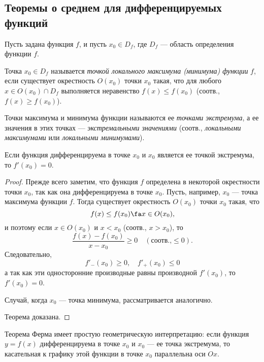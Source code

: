 \subsection{Теоремы о среднем для дифференцируемых функций}
Пусть задана функция $f$, и пусть $x_0 \in D_f$, где $D_f$ — область определения функции $f$.
\begin{defn}
Точка $x_0 \in D_f$ называется \textit{точкой локального максимума (минимума) функции} $f$, если существует окрестность $O(x_0)$ точки $x_0$ такая, что для любого $x \in O(x_0)\cap D_f$ выполняется неравенство $f(x) \le f(x_0)$ (соотв., $f(x) \ge f(x_0)$).
\end{defn}
\begin{defn} Точки максимума и минимума функции называются ее \textit{точками экстремума}, а ее значения в этих точках — \textit{экстремальными значениями} (соотв., \textit{локальными максимумами} или \textit{локальными минимумами}).
\end{defn}
\begin{thm}[Ферма]\label{ch4n1} 
Если функция дифференцируема в точке $x_0$ и $x_0$ является ее точкой экстремума, то $f'(x_0) = 0$.
\end{thm}
\begin{proof}
Прежде всего заметим, что функция $f$ определена в некоторой окрестности точки $x_0$, так как она дифференцируема в точке $x_0$. Пусть, например, $x_0$ — точка максимума функции $f$. Тогда существует окрестность $O(x_0)$ точки $x_0$ такая, что 
$$
f(x) \le f(x_0) \fa x \in O(x_0),
$$
и поэтому если $x \in O(x_0)$ и $x < x_0$ (соотв., $x > x_0$), то
$$
\frac{f(x)-f(x_0)}{x-x_0}\ge0\quad (\text{соотв.,} \le 0).
$$
Следовательно,
$$
f'_{-}(x_0)\ge 0, \quad f'_{+}(x_0)\le 0
$$
а так как эти односторонние производные равны производной $f'(x_0)$,
то $f'(x_0) = 0$. 

Случай, когда $x_0$ --- точка минимума, рассматривается аналогично. 

\noindent 
Теорема доказана.
\end{proof}

Теорема Ферма имеет простую геометрическую интерпретацию:	если функция $y = f(x)$ дифференцируема в точке $x_0$ и $x_0$ --- ее точка экстремума, то касательная к графику этой функции в точке $x_0$ параллельна оси $Ox$. 

